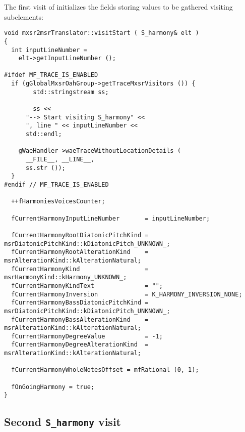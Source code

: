 The first visit of  initializes the fields storing values to be gathered visiting subelements:
\begin{lstlisting}[language=CPlusPlus]
void mxsr2msrTranslator::visitStart ( S_harmony& elt )
{
  int inputLineNumber =
    elt->getInputLineNumber ();

#ifdef MF_TRACE_IS_ENABLED
  if (gGlobalMxsrOahGroup->getTraceMxsrVisitors ()) {
		std::stringstream ss;

		ss <<
      "--> Start visiting S_harmony" <<
      ", line " << inputLineNumber <<
      std::endl;

    gWaeHandler->waeTraceWithoutLocationDetails (
      __FILE__, __LINE__,
      ss.str ());
  }
#endif // MF_TRACE_IS_ENABLED

  ++fHarmoniesVoicesCounter;

  fCurrentHarmonyInputLineNumber       = inputLineNumber;

  fCurrentHarmonyRootDiatonicPitchKind = msrDiatonicPitchKind::kDiatonicPitch_UNKNOWN_;
  fCurrentHarmonyRootAlterationKind    = msrAlterationKind::kAlterationNatural;
  fCurrentHarmonyKind                  = msrHarmonyKind::kHarmony_UNKNOWN_;
  fCurrentHarmonyKindText              = "";
  fCurrentHarmonyInversion             = K_HARMONY_INVERSION_NONE;
  fCurrentHarmonyBassDiatonicPitchKind = msrDiatonicPitchKind::kDiatonicPitch_UNKNOWN_;
  fCurrentHarmonyBassAlterationKind    = msrAlterationKind::kAlterationNatural;
  fCurrentHarmonyDegreeValue           = -1;
  fCurrentHarmonyDegreeAlterationKind  = msrAlterationKind::kAlterationNatural;

  fCurrentHarmonyWholeNotesOffset = mfRational (0, 1);

  fOnGoingHarmony = true;
}
\end{lstlisting}


\subsection{Second {\tt S_harmony} visit}

